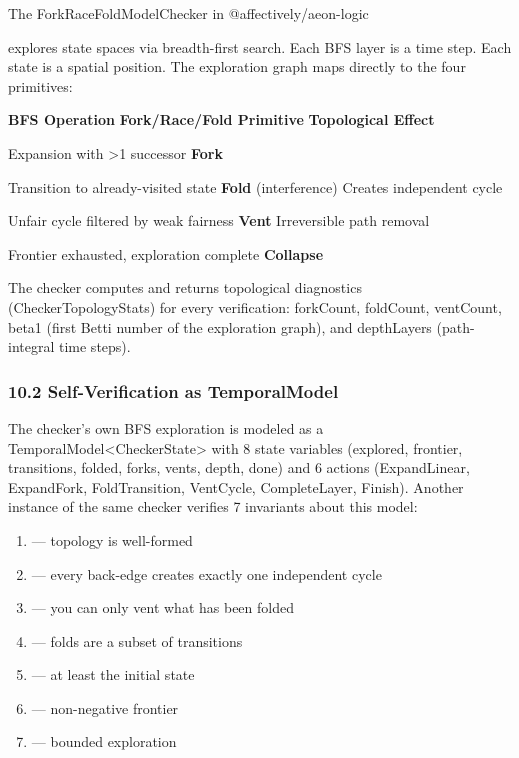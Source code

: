 \documentclass[
]{article}
\providecommand{\tightlist}{%
  \setlength{\itemsep}{0pt}\setlength{\parskip}{0pt}}
\begin{document}
The ForkRaceFoldModelChecker in @affectively/aeon-logic

explores state spaces via breadth-first search. Each BFS layer is a time
step. Each state is a spatial position. The exploration graph maps
directly to the four primitives:

\textbf{BFS Operation} \textbar{} \textbf{Fork/Race/Fold Primitive}
\textbar{} \textbf{Topological Effect} \textbar{}

Expansion with \textgreater1 successor \textbar{} \textbf{Fork}
\textbar{} \textbar{}

Transition to already-visited state \textbar{} \textbf{Fold}
(interference) \textbar{} Creates independent cycle \textbar{}

Unfair cycle filtered by weak fairness \textbar{} \textbf{Vent}
\textbar{} Irreversible path removal \textbar{}

Frontier exhausted, exploration complete \textbar{} \textbf{Collapse}
\textbar{} \textbar{}

The checker computes and returns topological diagnostics
(CheckerTopologyStats) for every verification: forkCount, foldCount,
ventCount, beta1 (first Betti number of the exploration graph), and
depthLayers (path-integral time steps).

\subsubsection{\texorpdfstring{\textbf{10.2 Self-Verification as
TemporalModel}}{10.2 Self-Verification as TemporalModel}}\label{self-verification-as-temporalmodel}

The checker's own BFS exploration is modeled as a
TemporalModel\textless CheckerState\textgreater{} with 8 state variables
(explored, frontier, transitions, folded, forks, vents, depth, done) and
6 actions (ExpandLinear, ExpandFork, FoldTransition, VentCycle,
CompleteLayer, Finish). Another instance of the same checker verifies 7
invariants about this model:

\begin{enumerate}
\def\labelenumi{\arabic{enumi}.}
\tightlist
\item
  --- topology is well-formed\\
\item
  --- every back-edge creates exactly one independent cycle\\
\item
  --- you can only vent what has been folded\\
\item
  --- folds are a subset of transitions\\
\item
  --- at least the initial state\\
\item
  --- non-negative frontier\\
\item
  --- bounded exploration
\end{enumerate}
\end{document}
